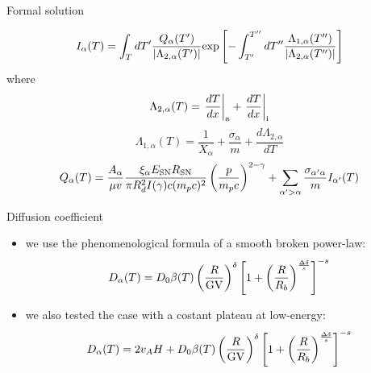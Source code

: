 \documentclass[9pt]{beamer}
\begin{document}
\begin{frame}{Formal solution}

\begin{equation}
I_\alpha(T) = \int_T dT' \frac{Q_\alpha(T')}{|\Lambda_{2,\alpha}(T')|} {\rm exp} 
\left[-\int_{T'}^{T''} dT''
\frac{\Lambda_{1,\alpha}(T'')}{|\Lambda_{2,\alpha}(T'')|} 
\right]
\end{equation}
%
where
%
\begin{equation}
\Lambda_{2,\alpha}(T) = \left.\frac{dT}{dx}\right|_{\rm a} + \left.\frac{dT}{dx}\right|_{\rm i} 
\end{equation}
%
\begin{equation}
\Lambda_{1,\alpha}(T) = \frac{1}{X_\alpha} + \frac{\sigma_\alpha}{m} + \frac{d\Lambda_{2,\alpha}}{dT}
\end{equation}
%
\begin{equation}\label{eq:sourceslab}
Q_\alpha(T) = \frac{A_\alpha}{\mu v} \frac{\xi_\alpha E_{\rm SN} R_{\rm SN}}{\pi R_d^2 I(\gamma)c(m_p c)^2} \left(\frac{p}{m_p c}\right)^{2-\gamma} + \sum_{\alpha'>\alpha} \frac{\sigma_{\alpha'\alpha}}{m} I_{\alpha'}(T)
\end{equation}

\end{frame}

\begin{frame}{Diffusion coefficient}

\begin{itemize}
\item we use the phenomenological formula of a smooth broken power-law: 
%
\begin{equation*}
D_\alpha(T) = D_0 \beta(T) \left(\frac{R}{\rm GV}\right)^\delta \left[1+\left(\frac{R}{R_b}\right)^{\frac{\Delta \delta}{s}}\right]^{-s}
\end{equation*}

\item we also tested the case with a costant plateau at low-energy:
%
\begin{equation*}
D_\alpha(T) = 2 v_A H + D_0 \beta(T) \left(\frac{R}{\rm GV}\right)^\delta \left[1+\left(\frac{R}{R_b}\right)^{\frac{\Delta \delta}{s}}\right]^{-s}
\end{equation*}
\end{itemize}

\end{frame}
\end{document}
